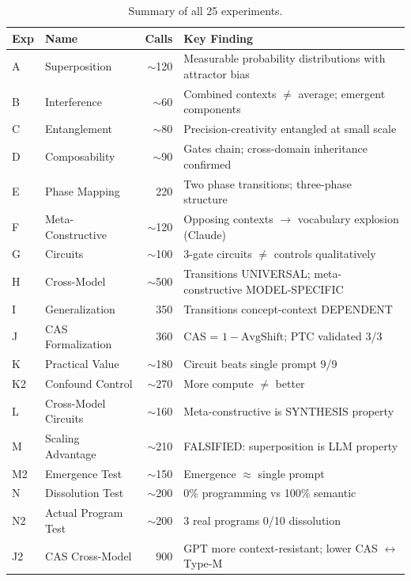 \documentclass[11pt,a4paper]{article}
\begin{document}
\begin{table}[H]
\centering
\caption{Summary of all 25 experiments.}
\small
\begin{tabular}{llrl}
\toprule
\textbf{Exp} & \textbf{Name} & \textbf{Calls} & \textbf{Key Finding} \\
\midrule
A  & Superposition         & $\sim$120 & Measurable probability distributions with attractor bias \\
B  & Interference          & $\sim$60  & Combined contexts $\neq$ average; emergent components \\
C  & Entanglement          & $\sim$80  & Precision-creativity entangled at small scale \\
D  & Composability         & $\sim$90  & Gates chain; cross-domain inheritance confirmed \\
E  & Phase Mapping         & 220       & Two phase transitions; three-phase structure \\
F  & Meta-Constructive     & $\sim$120 & Opposing contexts $\to$ vocabulary explosion (Claude) \\
G  & Circuits              & $\sim$100 & 3-gate circuits $\neq$ controls qualitatively \\
H  & Cross-Model           & $\sim$500 & Transitions UNIVERSAL; meta-constructive MODEL-SPECIFIC \\
I  & Generalization        & 350       & Transitions concept-context DEPENDENT \\
J  & CAS Formalization     & 360       & CAS = $1-\text{AvgShift}$; PTC validated 3/3 \\
K  & Practical Value       & $\sim$180 & Circuit beats single prompt 9/9 \\
K2 & Confound Control      & $\sim$270 & More compute $\neq$ better \\
L  & Cross-Model Circuits  & $\sim$160 & Meta-constructive is SYNTHESIS property \\
M  & Scaling Advantage     & $\sim$210 & FALSIFIED: superposition is LLM property \\
M2 & Emergence Test        & $\sim$150 & Emergence $\approx$ single prompt \\
N  & Dissolution Test      & $\sim$200 & 0\% programming vs 100\% semantic \\
N2 & Actual Program Test   & $\sim$200 & 3 real programs 0/10 dissolution \\
J2 & CAS Cross-Model       & 900       & GPT more context-resistant; lower CAS $\leftrightarrow$ Type-M \\

\end{tabular}
\end{table}
\end{document}
